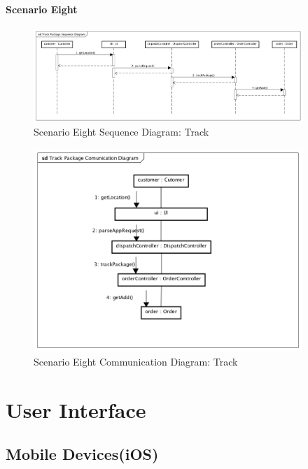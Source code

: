 \documentclass[12pt]{scrreprt}
\begin{document}
\subsubsection{Scenario Eight}
\begin{figure}[H]
  \centering\includegraphics[width=4in]{DocumentRes/8SequenceDiagram_track.png}
  \caption{Scenario Eight Sequence Diagram: Track}
\end{figure}
\begin{figure}[H]
  \centering\includegraphics[width=4in]{DocumentRes/8CommunicationDiagram_track.png}
  \caption{Scenario Eight Communication Diagram: Track}
\end{figure}

\chapter{User Interface}
\section{Mobile Devices(iOS)}
\end{document}
